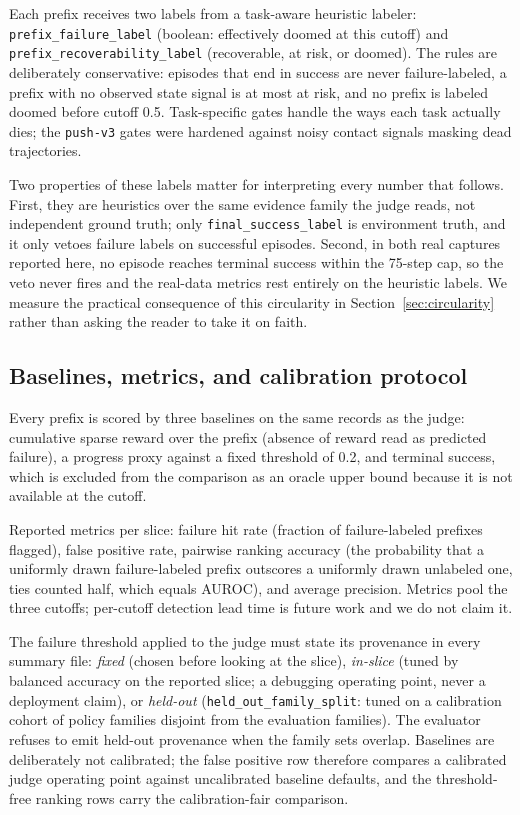 \documentclass[11pt]{article}
\begin{document}
Each prefix receives two labels from a task-aware heuristic labeler:
\texttt{prefix\_failure\_label} (boolean: effectively doomed at this cutoff) and
\texttt{prefix\_recoverability\_label} (recoverable, at risk, or doomed). The rules are
deliberately conservative: episodes that end in success are never failure-labeled, a prefix
with no observed state signal is at most at risk, and no prefix is labeled doomed before
cutoff 0.5. Task-specific gates handle the ways each task actually dies; the
\texttt{push-v3} gates were hardened against noisy contact signals masking dead trajectories.

Two properties of these labels matter for interpreting every number that follows. First,
they are heuristics over the same evidence family the judge reads, not independent ground
truth; only \texttt{final\_success\_label} is environment truth, and it only vetoes failure
labels on successful episodes. Second, in both real captures reported here, no episode
reaches terminal success within the 75-step cap, so the veto never fires and the real-data
metrics rest entirely on the heuristic labels. We measure the practical consequence of this
circularity in Section~\ref{sec:circularity} rather than asking the reader to take it on
faith.

\subsection{Baselines, metrics, and calibration protocol}
\label{sec:protocol}

Every prefix is scored by three baselines on the same records as the judge: cumulative
sparse reward over the prefix (absence of reward read as predicted failure), a progress
proxy against a fixed threshold of 0.2, and terminal success, which is excluded from the
comparison as an oracle upper bound because it is not available at the cutoff.

Reported metrics per slice: failure hit rate (fraction of failure-labeled prefixes flagged),
false positive rate, pairwise ranking accuracy (the probability that a uniformly drawn
failure-labeled prefix outscores a uniformly drawn unlabeled one, ties counted half, which
equals AUROC), and average precision. Metrics pool the three cutoffs; per-cutoff detection
lead time is future work and we do not claim it.

The failure threshold applied to the judge must state its provenance in every summary file:
\emph{fixed} (chosen before looking at the slice), \emph{in-slice} (tuned by balanced
accuracy on the reported slice; a debugging operating point, never a deployment claim), or
\emph{held-out} (\texttt{held\_out\_family\_split}: tuned on a calibration cohort of policy
families disjoint from the evaluation families). The evaluator refuses to emit held-out
provenance when the family sets overlap. Baselines are deliberately not calibrated; the
false positive row therefore compares a calibrated judge operating point against
uncalibrated baseline defaults, and the threshold-free ranking rows carry the
calibration-fair comparison.
\end{document}
